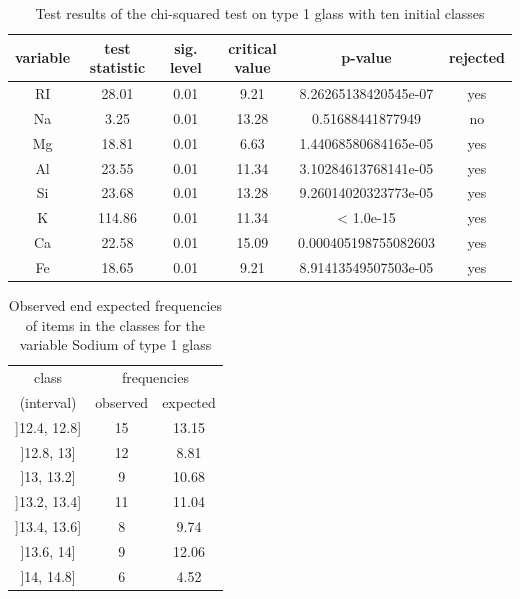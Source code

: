 \documentclass[a4paper, 12pt, titlepage, headsepline, listof = totoc, bibliography = totoc, numbers = noenddot]{scrartcl}
\begin{document}
\begin{table}[h!]
\centering
\begin{tabular}{|cccccc|} \hline variable & test statistic & sig. level & critical value & p-value & rejected\\ \hline RI & 28.01 & 0.01 & 9.21 & 8.26265138420545e-07 & yes\\ 
Na & 3.25 & 0.01 & 13.28 & 0.51688441877949 & no\\ 
Mg & 18.81 & 0.01 & 6.63 & 1.44068580684165e-05 & yes\\ 
Al & 23.55 & 0.01 & 11.34 & 3.10284613768141e-05 & yes\\ 
Si & 23.68 & 0.01 & 13.28 & 9.26014020323773e-05 & yes\\ 
K & 114.86 & 0.01 & 11.34 & < 1.0e-15 & yes\\ 
Ca & 22.58 & 0.01 & 15.09 & 0.000405198755082603 & yes\\ 
Fe & 18.65 & 0.01 & 9.21 & 8.91413549507503e-05 & yes\\ \hline \end{tabular}\caption{Test results of the chi-squared test on type 1 glass with ten initial classes}
\label{tab:chi-type1}
\end{table}

\begin{table}[h!]
\centering
\begin{tabular}{|c|cc|} \hline class & \multicolumn{2}{c|}{frequencies}\\ (interval) & observed & expected\\ \hline ]12.4, 12.8] & 15 & 13.15\\ 
]12.8, 13] & 12 & 8.81\\ 
]13, 13.2] & 9 & 10.68\\ 
]13.2, 13.4] & 11 & 11.04\\ 
]13.4, 13.6] & 8 & 9.74\\ 
]13.6, 14] & 9 & 12.06\\ 
]14, 14.8] & 6 & 4.52\\ \hline \end{tabular}\caption{Observed end expected frequencies of items in the classes for the variable Sodium of type 1 glass}
\label{tab:testresChisqFreqNaType1}
\end{table}
\end{document}
